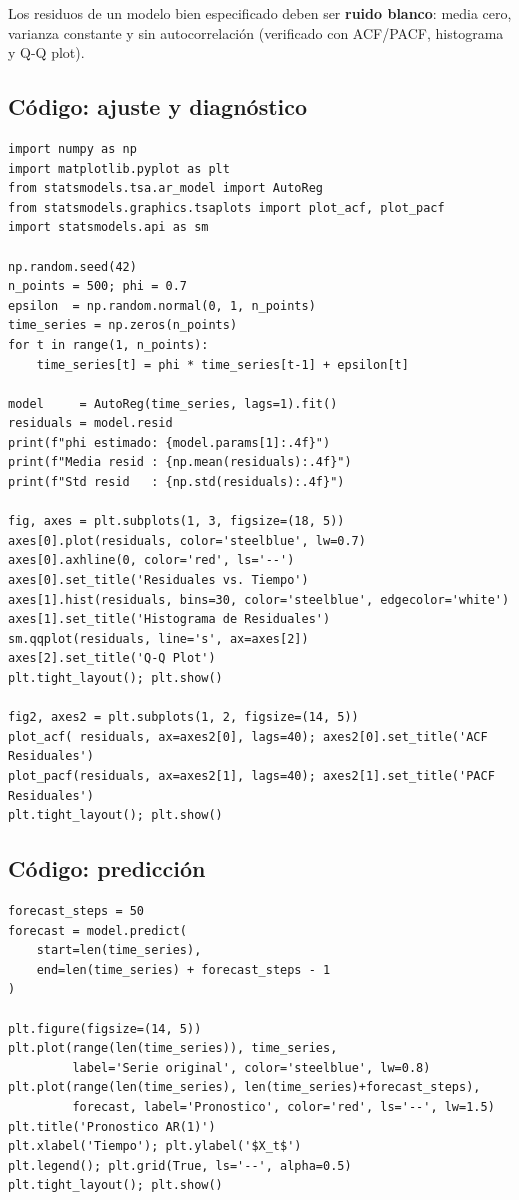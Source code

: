 \documentclass[12pt,letterpaper]{article}
\begin{document}
Los residuos de un modelo bien especificado deben ser \textbf{ruido blanco}:
media cero, varianza constante y sin autocorrelaci\'on (verificado con ACF/PACF,
histograma y Q-Q plot).

\subsection{C\'odigo: ajuste y diagn\'ostico}

\begin{lstlisting}[style=python, caption={AR(1): ajuste y diagn\'ostico de residuos}]
import numpy as np
import matplotlib.pyplot as plt
from statsmodels.tsa.ar_model import AutoReg
from statsmodels.graphics.tsaplots import plot_acf, plot_pacf
import statsmodels.api as sm

np.random.seed(42)
n_points = 500; phi = 0.7
epsilon  = np.random.normal(0, 1, n_points)
time_series = np.zeros(n_points)
for t in range(1, n_points):
    time_series[t] = phi * time_series[t-1] + epsilon[t]

model     = AutoReg(time_series, lags=1).fit()
residuals = model.resid
print(f"phi estimado: {model.params[1]:.4f}")
print(f"Media resid : {np.mean(residuals):.4f}")
print(f"Std resid   : {np.std(residuals):.4f}")

fig, axes = plt.subplots(1, 3, figsize=(18, 5))
axes[0].plot(residuals, color='steelblue', lw=0.7)
axes[0].axhline(0, color='red', ls='--')
axes[0].set_title('Residuales vs. Tiempo')
axes[1].hist(residuals, bins=30, color='steelblue', edgecolor='white')
axes[1].set_title('Histograma de Residuales')
sm.qqplot(residuals, line='s', ax=axes[2])
axes[2].set_title('Q-Q Plot')
plt.tight_layout(); plt.show()

fig2, axes2 = plt.subplots(1, 2, figsize=(14, 5))
plot_acf( residuals, ax=axes2[0], lags=40); axes2[0].set_title('ACF Residuales')
plot_pacf(residuals, ax=axes2[1], lags=40); axes2[1].set_title('PACF Residuales')
plt.tight_layout(); plt.show()
\end{lstlisting}

\subsection{C\'odigo: predicci\'on}

\begin{lstlisting}[style=python, caption={Pron\'ostico con modelo AR(1)}]
forecast_steps = 50
forecast = model.predict(
    start=len(time_series),
    end=len(time_series) + forecast_steps - 1
)

plt.figure(figsize=(14, 5))
plt.plot(range(len(time_series)), time_series,
         label='Serie original', color='steelblue', lw=0.8)
plt.plot(range(len(time_series), len(time_series)+forecast_steps),
         forecast, label='Pronostico', color='red', ls='--', lw=1.5)
plt.title('Pronostico AR(1)')
plt.xlabel('Tiempo'); plt.ylabel('$X_t$')
plt.legend(); plt.grid(True, ls='--', alpha=0.5)
plt.tight_layout(); plt.show()
\end{lstlisting}
\end{document}

